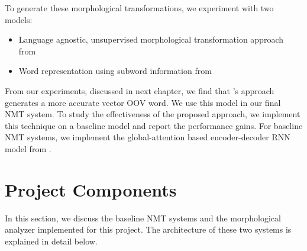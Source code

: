 

To generate these morphological transformations, we experiment with two models: 
\begin{itemize}
	\item Language agnostic, unsupervised morphological transformation approach from \cite{soricut2015unsupervised}
	\item Word representation using subword information from \cite{bojanowski2016enriching}
\end{itemize}

From our experiments, discussed in next chapter, we find that \citeauthor{bojanowski2016enriching}'s approach generates a more accurate vector OOV word. We use this model in our final NMT system. To study the effectiveness of the proposed approach, we implement this technique on a baseline model and report the performance gains. For baseline NMT systems, we implement the global-attention based encoder-decoder RNN model from \cite{luong2015effective}. 




\section{Project Components}
\label{sec:components}
In this section, we discuss the baseline NMT systems and the morphological analyzer implemented for this project. The architecture of these two systems is explained in detail below.

%
%

